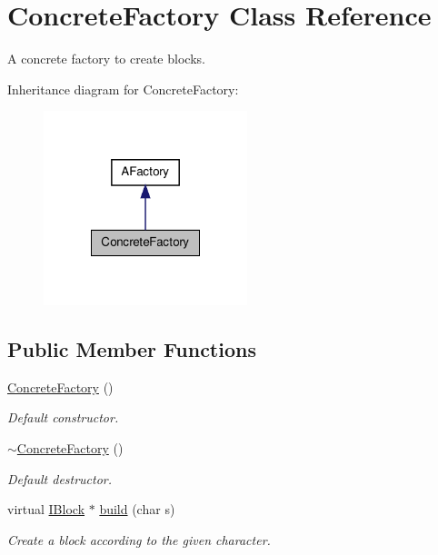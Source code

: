 \hypertarget{class_concrete_factory}{\section{Concrete\-Factory Class Reference}
\label{class_concrete_factory}
}


A concrete factory to create blocks.  




Inheritance diagram for Concrete\-Factory\-:\nopagebreak
\begin{figure}[H]
\begin{center}
\leavevmode
\includegraphics[width=168pt]{class_concrete_factory__inherit__graph}
\end{center}
\end{figure}
\subsection*{Public Member Functions}
\begin{DoxyCompactItemize}
\item 
\hypertarget{class_concrete_factory_a3168082099002e3a6edf4c8cd49847aa}{\hyperlink{class_concrete_factory_a3168082099002e3a6edf4c8cd49847aa}{Concrete\-Factory} ()}\label{class_concrete_factory_a3168082099002e3a6edf4c8cd49847aa}

\begin{DoxyCompactList}\small\item\em Default constructor. \end{DoxyCompactList}\item 
\hypertarget{class_concrete_factory_a9f5ffcdb2424b62151526a4d0cd39a55}{\hyperlink{class_concrete_factory_a9f5ffcdb2424b62151526a4d0cd39a55}{$\sim$\-Concrete\-Factory} ()}\label{class_concrete_factory_a9f5ffcdb2424b62151526a4d0cd39a55}

\begin{DoxyCompactList}\small\item\em Default destructor. \end{DoxyCompactList}\item 
virtual \hyperlink{class_i_block}{I\-Block} $\ast$ \hyperlink{class_concrete_factory_a74d4adfe19116f2fbc31f1c3b745a297}{build} (char s)
\begin{DoxyCompactList}\small\item\em Create a block according to the given character. \end{DoxyCompactList}\end{DoxyCompactItemize}
